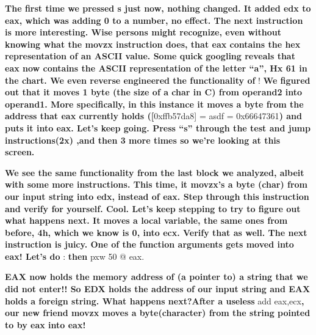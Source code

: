   
\textbf{The first time we pressed s just now, nothing changed. It added edx to eax, which was adding 0 to a number, no
effect. The next instruction is more interesting. Wise persons might recognize, even without knowing what the movzx
instruction does, that eax contains the hex representation of an ASCII value. Some quick googling reveals that eax now
contains the ASCII representation of the letter ``a'', Hx 61 in the chart. We even reverse engineered the functionality
of }  
 !\newline
\textbf{We figured out that it moves 1 byte (the size of a char in C) from operand2 into operand1.  More specifically,
in this instance it moves a byte from the address that eax currently holds ([}0xffb57da8] = asdf = 0x66647361\textbf{)
and puts it into eax. Let's keep going. Press ``s'' through the test and jump instructions(2x) ,and then 3 more times
so we're looking at this screen.}  
 

\begin{center}
 

\end{center}
\textbf{We see the same functionality from the last block we analyzed, albeit with some more instructions. This time, it
movzx's a byte (char) from our input string into edx, instead of eax. Step through this instruction and verify for
yourself.\newline
Cool. Let's keep stepping to try to figure out what happens next. It moves a local variable, the same ones from before,
4h, which we know is 0, into ecx. Verify that as well. The next instruction is juicy. One of the function arguments
gets moved into eax! Let's do} : \textbf{then }pxw 50 @ eax.   
 

\begin{center}
 

\end{center}
\textbf{EAX now holds the memory address of (a pointer to) a string that we did not enter!! So EDX holds the address of
our input string and EAX holds a foreign string. What happens next?After a useless }add eax,ecx\textbf{, our new friend
movzx moves a byte(character) from the string pointed to by eax into eax! }  
 

